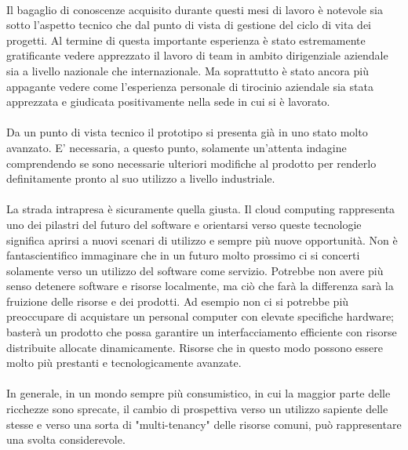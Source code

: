 \paragraph{}
Il bagaglio di conoscenze acquisito durante questi mesi di lavoro è notevole sia sotto l'aspetto tecnico che dal punto di vista di gestione del ciclo di vita dei progetti. Al termine di questa importante esperienza è stato estremamente gratificante vedere apprezzato il lavoro di team in ambito dirigenziale aziendale sia a livello nazionale che internazionale. Ma soprattutto è stato ancora più appagante vedere come l'esperienza personale di tirocinio aziendale sia stata apprezzata e giudicata positivamente nella sede in cui si è lavorato.

\paragraph{}
Da un punto di vista tecnico il prototipo si presenta già in uno stato molto avanzato. E' necessaria, a questo punto, solamente un'attenta indagine comprendendo se sono necessarie ulteriori modifiche al prodotto per renderlo definitamente pronto al suo utilizzo a livello industriale.
\paragraph{}
La strada intrapresa è sicuramente quella giusta. Il cloud computing rappresenta uno dei pilastri del futuro del software e orientarsi verso queste tecnologie significa aprirsi a nuovi scenari di utilizzo e sempre più nuove opportunità. Non è fantascientifico immaginare che in un futuro molto prossimo ci si concerti solamente verso un utilizzo del software come servizio. Potrebbe non avere più senso detenere software e risorse localmente, ma ciò che farà la differenza sarà la fruizione delle risorse e dei prodotti. Ad esempio non ci si potrebbe più preoccupare di acquistare un personal computer con elevate specifiche hardware; basterà un prodotto che possa garantire un interfacciamento efficiente con risorse distribuite allocate dinamicamente. Risorse che in questo modo possono essere molto più prestanti e tecnologicamente avanzate.
\paragraph{}
In generale, in un mondo sempre più consumistico, in cui la maggior parte delle ricchezze sono sprecate, il cambio di prospettiva verso un utilizzo sapiente delle stesse e verso una sorta di "multi-tenancy" delle risorse comuni, può rappresentare una svolta considerevole.